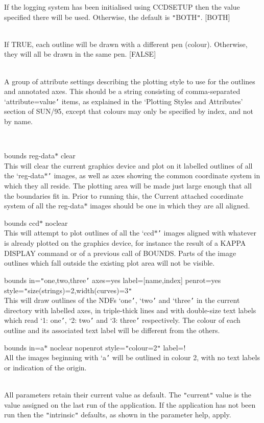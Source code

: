 \documentclass[twoside,11pt]{article}
\newcommand{\xref}[3]{#1}
\renewcommand{\_}{\texttt{\symbol{95}}}
\newcommand{\routine}[1]{{\sc #1}}
\newcommand{\sstexamples}[1]{
   \item[Examples:] \mbox{} \\
   \vspace{-3.5ex}
   \begin{description}
      #1
   \end{description}
}
\newcommand{\sstsubsection}[1]{ \item[{#1}] \mbox{} \\}
\newcommand{\sstexamplesubsection}[2]{\sloppy \item{\ssttt #1} \mbox{} \\ #2 }
\newcommand{\sstdiytopic}[2]{\item[#1:] \mbox{} \\[1.3ex] #2}
\newcommand{\sstexamples}[1]{
      \item[Examples:] \\
      \begin{description}
         #1
      \end{description}
      \\
   }
\newcommand{\sstsubsection}[1]{\item[{#1}]}
\newcommand{\sstexamplesubsection}[2]{\item[{\ssttt #1}] #2}
\newcommand{\sstdiytopic}[2]{\item[{#1}] #2 }
\begin{document}
{{{{         }
         If the logging system has been initialised using CCDSETUP
         then the value specified there will be used. Otherwise, the
         default is {\tt "}BOTH{\tt "}.
         [BOTH]
      }
      \sstsubsection{
         PENROT = \_LOGICAL (Read)
      }{
         If TRUE, each outline will be drawn with a different pen
         (colour).  Otherwise, they will all be drawn in the same pen.
         [FALSE]
      }
      \sstsubsection{
         STYLE = LITERAL (Read)
      }{
         A group of attribute settings describing the plotting style
         to use for the outlines and annotated axes.  This should be
         a string consisting of comma-separated `attribute=value{\tt '}
         items, as explained in the `\xref{Plotting Styles and Attributes}{sun95}{se_style}'
         section of \xref{SUN/95}{sun95}{}, except that colours may only be specified
         by index, and not by name.
      }
   }
   \sstexamples{
      \sstexamplesubsection{
         bounds reg-data$*$ clear
      }{
         This will clear the current graphics device and plot on it
         labelled outlines of all the `reg-data$*${\tt '} images, as well as
         axes showing the common coordinate system in which they
         all reside.  The plotting area will be made just large enough
         that all the boundaries fit in.  Prior to running this, the
         Current attached coordinate system of all the reg-data$*$ images
         should be one in which they are all aligned.
      }
      \sstexamplesubsection{
         bounds ccd$*$ noclear
      }{
         This will attempt to plot outlines of all the `ccd$*${\tt '} images
         aligned with whatever is already plotted on the graphics
         device, for instance the result of a KAPPA \xref{DISPLAY}{sun95}{DISPLAY} command
         or of a previous call of \routine{BOUNDS}.  Parts of the image outlines
         which fall outside the existing plot area will not be visible.
      }
      \sstexamplesubsection{
         bounds in={\tt "}one,two,three{\tt '} axes=yes label=[name,index] 
                penrot=yes style={\tt "}size(strings)=2,width(curves)=3{\tt "}
      }{
         This will draw outlines of the NDFs `one{\tt '}, `two{\tt '} and `three{\tt '}
         in the current directory with labelled axes, in triple-thick
         lines and with double-size text labels which read `1: one{\tt '},
         `2: two{\tt '} and `3: three{\tt '} respectively.  The colour of each
         outline and its associated text label will be different from
         the others.
      }
      \sstexamplesubsection{
         bounds in=a$*$ noclear nopenrot style={\tt "}colour=2{\tt "} 
                label=!
      }{
         All the images beginning with `a{\tt '} will be outlined in colour 2,
         with no text labels or indication of the origin.
      }
   }
   \sstdiytopic{
      Behaviour of Parameters
   }{
      All parameters retain their current value as default. The
      {\tt "}current{\tt "} value is the value assigned on the last run of the
      application. If the application has not been run then the
      {\tt "}intrinsic{\tt "} defaults, as shown in the parameter help, apply.

}}
\end{document}
